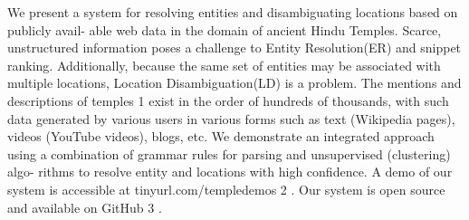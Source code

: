 We present a system for resolving entities and disambiguating locations based on publicly avail- able web data in the domain of ancient Hindu Temples. Scarce, unstructured information poses a challenge to Entity Resolution(ER) and snippet ranking. Additionally, because the same set of entities may be associated with multiple locations, Location Disambiguation(LD) is a problem. The mentions and descriptions of temples 1 exist in the order of hundreds of thousands, with such data generated by various users in various forms such as text (Wikipedia pages), videos (YouTube videos), blogs, etc. We demonstrate an integrated approach using a combination of grammar rules for parsing and unsupervised (clustering) algo- rithms to resolve entity and locations with high confidence. A demo of our system is accessible at tinyurl.com/templedemos 2 . Our system is open source and available on GitHub 3 .
